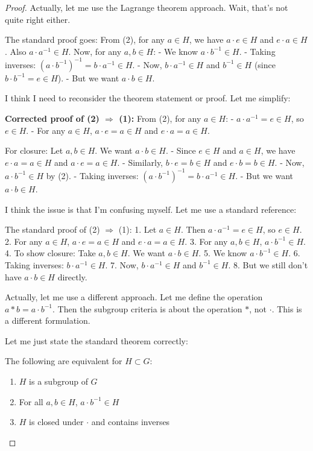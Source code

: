 \begin{proof}
Actually, let me use the Lagrange theorem approach. Wait, that's not quite right either.

The standard proof goes: From (2), for any $a \in H$, we have $a \cdot e \in H$ and $e \cdot a \in H$. Also $a \cdot a^{-1} \in H$. Now, for any $a, b \in H$:
- We know $a \cdot b^{-1} \in H$.
- Taking inverses: $(a \cdot b^{-1})^{-1} = b \cdot a^{-1} \in H$.
- Now, $b \cdot a^{-1} \in H$ and $b^{-1} \in H$ (since $b \cdot b^{-1} = e \in H$).
- But we want $a \cdot b \in H$.

I think I need to reconsider the theorem statement or proof. Let me simplify:

\textbf{Corrected proof of (2) $\Rightarrow$ (1):}
From (2), for any $a \in H$:
- $a \cdot a^{-1} = e \in H$, so $e \in H$.
- For any $a \in H$, $a \cdot e = a \in H$ and $e \cdot a = a \in H$.

For closure: Let $a, b \in H$. We want $a \cdot b \in H$.
- Since $e \in H$ and $a \in H$, we have $e \cdot a = a \in H$ and $a \cdot e = a \in H$.
- Similarly, $b \cdot e = b \in H$ and $e \cdot b = b \in H$.
- Now, $a \cdot b^{-1} \in H$ by (2).
- Taking inverses: $(a \cdot b^{-1})^{-1} = b \cdot a^{-1} \in H$.
- But we want $a \cdot b \in H$.

I think the issue is that I'm confusing myself. Let me use a standard reference:

The standard proof of (2) $\Rightarrow$ (1):
1. Let $a \in H$. Then $a \cdot a^{-1} = e \in H$, so $e \in H$.
2. For any $a \in H$, $a \cdot e = a \in H$ and $e \cdot a = a \in H$.
3. For any $a, b \in H$, $a \cdot b^{-1} \in H$.
4. To show closure: Take $a, b \in H$. We want $a \cdot b \in H$.
5. We know $a \cdot b^{-1} \in H$.
6. Taking inverses: $b \cdot a^{-1} \in H$.
7. Now, $b \cdot a^{-1} \in H$ and $b^{-1} \in H$.
8. But we still don't have $a \cdot b \in H$ directly.

Actually, let me use a different approach. Let me define the operation $a * b = a \cdot b^{-1}$. Then the subgroup criteria is about the operation $*$, not $\cdot$. This is a different formulation.

Let me just state the standard theorem correctly:

\begin{theorem}
\label{thm:subgroup-criteria-corrected}
The following are equivalent for $H \subset G$:
\begin{enumerate}
\item $H$ is a subgroup of $G$
\item For all $a, b \in H$, $a \cdot b^{-1} \in H$
\item $H$ is closed under $\cdot$ and contains inverses
\end{enumerate}
\end{theorem}


\end{proof}

